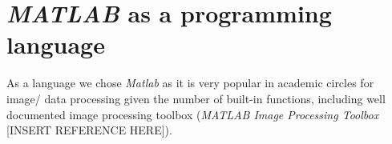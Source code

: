 %
%
%	
%	


\section{\textit{MATLAB} as a programming language}

As a language we chose \textit{Matlab} as it is very popular in academic circles for image/ data processing given the number of built-in functions, including well documented image processing toolbox (\textit{MATLAB Image Processing Toolbox} [INSERT REFERENCE HERE]).


